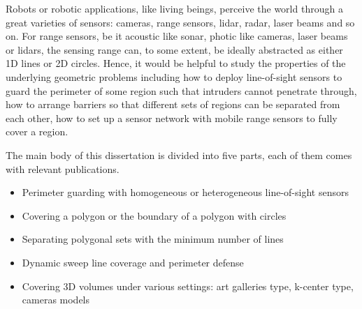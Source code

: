 \begin{my_abstract}

Robots or robotic applications, like living beings, perceive the world through
a great varieties of sensors: cameras, range sensors, lidar, radar, laser beams and so on.
For range sensors, be it acoustic like sonar, photic like cameras, laser beams or lidars, 
the sensing range can, to some extent, be ideally abstracted as either 1D lines or 2D circles.
Hence, it would be helpful to study the properties of the underlying geometric problems including 
how to deploy line-of-sight sensors to guard the perimeter of some region such that intruders cannot penetrate through, 
how to arrange barriers so that different sets of regions can be separated from each other,
how to set up a sensor network with mobile range sensors to fully cover a region. 

The main body of this dissertation is divided into five parts, each of them comes with relevant publications. 
\begin{itemize}
    \item Perimeter guarding with homogeneous or heterogeneous line-of-sight sensors
    \item Covering a polygon or the boundary of a polygon with circles
    \item Separating polygonal sets with the minimum number of lines
    \item Dynamic sweep line coverage and perimeter defense
    \item Covering 3D volumes under various settings: art galleries type, k-center type, cameras models
\end{itemize}

\end{my_abstract}